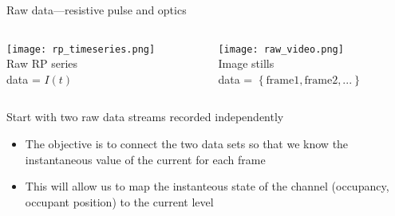 \begin{frame}[c]{Raw data---resistive pulse and optics}

	\begin{columns}[t]
		\begin{column}[T]{2.25in}
			{\centering 
				\texttt{[image: rp\_timeseries.png]} \\
				Raw RP series \\
				data = $I\left(t\right)$ \\
				\par
			}
		\end{column}
		
		
		\begin{column}[T]{2.25in}
			{\centering 
				\texttt{[image: raw\_video.png]} \\
				Image stills \\
				data = $\left\{\mathrm{frame1, frame2, ...}\right\}$
				\par
			}
		\end{column}
	\end{columns}
	\vspace{.2in}
	
	Start with two raw data streams recorded independently \\
		
	\begin{itemize}
		\item The objective is to connect the two data sets so that we know the instantaneous value of the current for each frame
		\item This will allow us to map the instanteous state of the channel (occupancy, occupant position) to the current level
	\end{itemize}



\end{frame}




